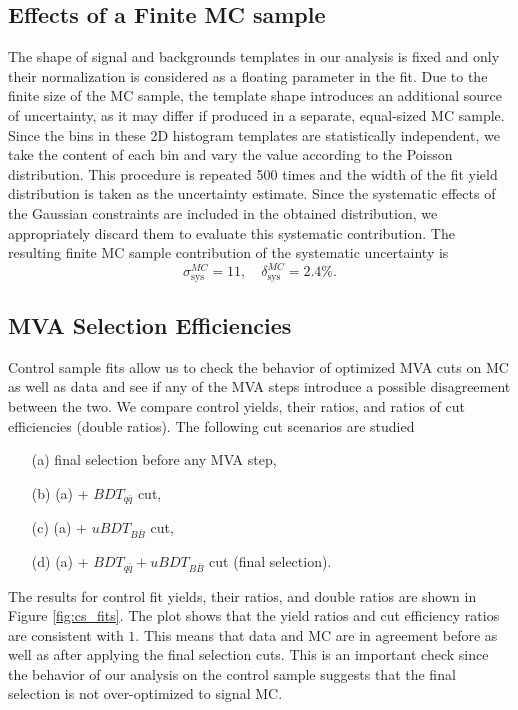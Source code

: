 \subsection{Effects of a Finite MC sample}
The shape of signal and backgrounds templates in our analysis is fixed and only their normalization is considered as a floating parameter in the fit. Due to the finite size of the MC sample, the template shape introduces an additional source of uncertainty, as it may differ if produced in a separate, equal-sized MC sample. Since the bins in these 2D histogram templates are statistically independent, we take the content of each bin and vary the value according to the Poisson distribution. This procedure is repeated 500 times and the width of the fit yield distribution is taken as the uncertainty estimate. Since the systematic effects of the Gaussian constraints are included in the obtained distribution, we appropriately discard them to evaluate this systematic contribution. The resulting finite MC sample contribution of the systematic uncertainty is
\begin{equation}
\sigma_{\mathrm{sys}}^{MC} = 11,\quad \delta_{\mathrm{sys}}^{MC} = 2.4\%.
\end{equation}


\subsection{MVA Selection Efficiencies}
Control sample fits allow us to check the behavior of optimized MVA cuts on MC as well as data and see if any of the MVA steps introduce a possible disagreement between the two. We compare control yields, their ratios, and ratios of cut efficiencies (double ratios). The following cut scenarios are studied
\begin{itemize}
	\item[(a)] final selection before any MVA step,
	\item[(b)] (a) + $BDT_{q\bar q}$ cut,
	\item[(c)] (a) + $uBDT_{B\bar B}$ cut,
	\item[(d)] (a) + $BDT_{q\bar q} + uBDT_{B\bar B}$ cut (final selection).
\end{itemize}

The results for control fit yields, their ratios, and double ratios are shown in Figure \ref{fig:cs_fits}. The plot shows that the yield ratios and cut efficiency ratios are consistent with $1$. This means that data and MC are in agreement before as well as after applying the final selection cuts. This is an important check since the behavior of our analysis on the control sample suggests that the final selection is not over-optimized to signal MC.

